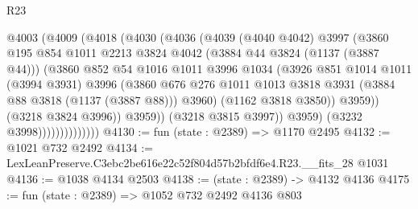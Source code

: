 \begin{lexlean}{R23}
\begin{coremodule}
                            @4003
                              (@4009
                                (@4018
                                  (@4030
                                    (@4036
                                      (@4039
                                        (@4040 @4042)
                                        @3997
                                        (@3860
                                          @195
                                          @854
                                          @1011
                                          @2213
                                          @3824
                                          @4042
                                          (@3884 @44 @3824 (@1137 (@3887 @44)))
                                          (@3860
                                            @852
                                            @54
                                            @1016
                                            @1011
                                            @3996
                                            @1034
                                            (@3926
                                              @851
                                              @1014
                                              @1011
                                              (@3994 @3931)
                                              @3996
                                              (@3860
                                                @676
                                                @276
                                                @1011
                                                @1013
                                                @3818
                                                @3931
                                                (@3884 @88 @3818 (@1137 (@3887 @88)))
                                                @3960)
                                              (@1162 @3818 @3850))
                                            @3959))
                                        (@3218 @3824 @3996))
                                      @3959))
                                  (@3218 @3815 @3997))
                                @3959)
                              (@3232 @3998))))))))))))))
@4130 := fun (state : @2389) => @1170 @2495
@4132 := @1021 @732 @2492
@4134 := LexLeanPreserve.C3ebc2be616e22c52f804d57b2bfdf6e4.R23.__fits_28 @1031
@4136 := @1038 @4134 @2503
@4138 := (state : @2389) -> @4132 @4136
@4175 := fun (state : @2389) =>
  @1052
    @732
    @2492
    @4136
    @803

\end{coremodule}
\end{lexlean}
